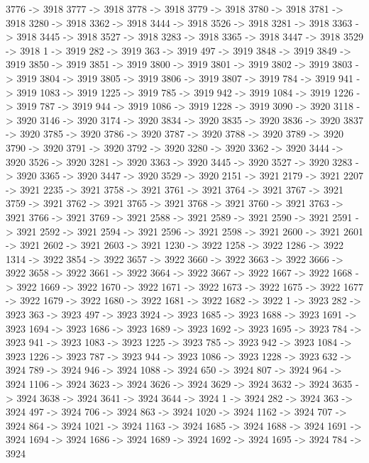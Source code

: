 {	3776 -> 3918
	3777 -> 3918
	3778 -> 3918
	3779 -> 3918
	3780 -> 3918
	3781 -> 3918
	3280 -> 3918
	3362 -> 3918
	3444 -> 3918
	3526 -> 3918
	3281 -> 3918
	3363 -> 3918
	3445 -> 3918
	3527 -> 3918
	3283 -> 3918
	3365 -> 3918
	3447 -> 3918
	3529 -> 3918
	1 -> 3919
	282 -> 3919
	363 -> 3919
	497 -> 3919
	3848 -> 3919
	3849 -> 3919
	3850 -> 3919
	3851 -> 3919
	3800 -> 3919
	3801 -> 3919
	3802 -> 3919
	3803 -> 3919
	3804 -> 3919
	3805 -> 3919
	3806 -> 3919
	3807 -> 3919
	784 -> 3919
	941 -> 3919
	1083 -> 3919
	1225 -> 3919
	785 -> 3919
	942 -> 3919
	1084 -> 3919
	1226 -> 3919
	787 -> 3919
	944 -> 3919
	1086 -> 3919
	1228 -> 3919
	3090 -> 3920
	3118 -> 3920
	3146 -> 3920
	3174 -> 3920
	3834 -> 3920
	3835 -> 3920
	3836 -> 3920
	3837 -> 3920
	3785 -> 3920
	3786 -> 3920
	3787 -> 3920
	3788 -> 3920
	3789 -> 3920
	3790 -> 3920
	3791 -> 3920
	3792 -> 3920
	3280 -> 3920
	3362 -> 3920
	3444 -> 3920
	3526 -> 3920
	3281 -> 3920
	3363 -> 3920
	3445 -> 3920
	3527 -> 3920
	3283 -> 3920
	3365 -> 3920
	3447 -> 3920
	3529 -> 3920
	2151 -> 3921
	2179 -> 3921
	2207 -> 3921
	2235 -> 3921
	3758 -> 3921
	3761 -> 3921
	3764 -> 3921
	3767 -> 3921
	3759 -> 3921
	3762 -> 3921
	3765 -> 3921
	3768 -> 3921
	3760 -> 3921
	3763 -> 3921
	3766 -> 3921
	3769 -> 3921
	2588 -> 3921
	2589 -> 3921
	2590 -> 3921
	2591 -> 3921
	2592 -> 3921
	2594 -> 3921
	2596 -> 3921
	2598 -> 3921
	2600 -> 3921
	2601 -> 3921
	2602 -> 3921
	2603 -> 3921
	1230 -> 3922
	1258 -> 3922
	1286 -> 3922
	1314 -> 3922
	3854 -> 3922
	3657 -> 3922
	3660 -> 3922
	3663 -> 3922
	3666 -> 3922
	3658 -> 3922
	3661 -> 3922
	3664 -> 3922
	3667 -> 3922
	1667 -> 3922
	1668 -> 3922
	1669 -> 3922
	1670 -> 3922
	1671 -> 3922
	1673 -> 3922
	1675 -> 3922
	1677 -> 3922
	1679 -> 3922
	1680 -> 3922
	1681 -> 3922
	1682 -> 3922
	1 -> 3923
	282 -> 3923
	363 -> 3923
	497 -> 3923
	3924 -> 3923
	1685 -> 3923
	1688 -> 3923
	1691 -> 3923
	1694 -> 3923
	1686 -> 3923
	1689 -> 3923
	1692 -> 3923
	1695 -> 3923
	784 -> 3923
	941 -> 3923
	1083 -> 3923
	1225 -> 3923
	785 -> 3923
	942 -> 3923
	1084 -> 3923
	1226 -> 3923
	787 -> 3923
	944 -> 3923
	1086 -> 3923
	1228 -> 3923
	632 -> 3924
	789 -> 3924
	946 -> 3924
	1088 -> 3924
	650 -> 3924
	807 -> 3924
	964 -> 3924
	1106 -> 3924
	3623 -> 3924
	3626 -> 3924
	3629 -> 3924
	3632 -> 3924
	3635 -> 3924
	3638 -> 3924
	3641 -> 3924
	3644 -> 3924
	1 -> 3924
	282 -> 3924
	363 -> 3924
	497 -> 3924
	706 -> 3924
	863 -> 3924
	1020 -> 3924
	1162 -> 3924
	707 -> 3924
	864 -> 3924
	1021 -> 3924
	1163 -> 3924
	1685 -> 3924
	1688 -> 3924
	1691 -> 3924
	1694 -> 3924
	1686 -> 3924
	1689 -> 3924
	1692 -> 3924
	1695 -> 3924
	784 -> 3924
}
